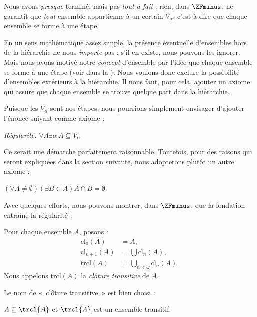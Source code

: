 \documentclass[../../../include/open-logic-section]{subfiles}
\begin{document}


Nous avons \emph{presque} terminé, mais pas \emph{tout à fait} :
rien, dans $\ZFminus$, ne garantit que \emph{tout} ensemble
appartienne à un certain $V_\alpha$, c'est-à-dire que chaque
ensemble se forme à une étape.

En un sens mathématique assez simple, la présence éventuelle
d'ensembles hors de la hiérarchie ne nous \emph{importe} pas : s'il
en existe, nous pouvons les ignorer. Mais nous avons motivé notre
\emph{concept} d'ensemble par l'idée que chaque ensemble se forme à
une étape (voir \stageshier{} dans la ). Nous
voulons donc exclure la possibilité d'ensembles extérieurs à la
hiérarchie. Il nous faut, pour cela, ajouter un axiome qui assure que
chaque ensemble se trouve quelque part dans la hiérarchie.

Puisque les $V_\alpha$ sont nos étapes, nous pourrions simplement
envisager d'ajouter l'énoncé suivant comme axiome :

\begin{defish}
\emph{Régularité.} $\forall A \exists \alpha\, A \subseteq V_\alpha$
\end{defish}

Ce serait une démarche parfaitement raisonnable. Toutefois, pour
des raisons qui seront expliquées dans la section suivante, nous
adopterons plutôt un autre axiome :

\begin{axiom}[Fondation]
$(\forall A \neq \emptyset)(\exists B \in A)A \cap B = \emptyset$.
\end{axiom}

Avec quelques efforts, nous pouvons montrer, dans $\ZFminus$, que
la fondation entraîne la régularité :
\begin{defn}
Pour chaque ensemble $A$, posons :
\begin{align*}
	\text{cl}_0(A) &= A,\\
	\text{cl}_{n+1}(A) &= \bigcup \text{cl}_n(A),\\
	\text{trcl}(A) &= \bigcup_{n < \omega} \text{cl}_{n}(A).
\end{align*}
Nous appelons $\text{trcl}(A)$ la \emph{clôture transitive} de $A$.
\end{defn}
\noindent
Le nom de «~clôture transitive~» est bien choisi :
\begin{prop}
$A \subseteq \trcl{A}$ et $\trcl{A}$ est un ensemble transitif.
\end{prop}
\end{document}
